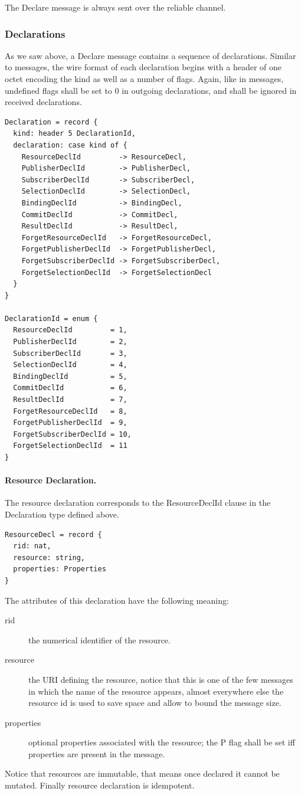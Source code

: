 \documentclass[a4paper,oneside,article]{memoir}
\begin{document}
The Declare message is always sent over the reliable channel.

\subsubsection{Declarations}

As we saw above, a Declare message contains a sequence of declarations.  Similar to messages, the
wire format of each declaration begins with a header of one octet encoding the kind as well as a
number of flags.  Again, like in messages, undefined flags shall be set to 0 in outgoing
declarations, and shall be ignored in received declarations.

\begin{verbatim}
Declaration = record {
  kind: header 5 DeclarationId,
  declaration: case kind of {
    ResourceDeclId         -> ResourceDecl,
    PublisherDeclId        -> PublisherDecl,
    SubscriberDeclId       -> SubscriberDecl,
    SelectionDeclId        -> SelectionDecl,
    BindingDeclId          -> BindingDecl,
    CommitDeclId           -> CommitDecl,
    ResultDeclId           -> ResultDecl,
    ForgetResourceDeclId   -> ForgetResourceDecl,
    ForgetPublisherDeclId  -> ForgetPublisherDecl,
    ForgetSubscriberDeclId -> ForgetSubscriberDecl,
    ForgetSelectionDeclId  -> ForgetSelectionDecl
  }
}

DeclarationId = enum {
  ResourceDeclId         = 1,
  PublisherDeclId        = 2,
  SubscriberDeclId       = 3,
  SelectionDeclId        = 4,
  BindingDeclId          = 5,
  CommitDeclId           = 6,
  ResultDeclId           = 7,
  ForgetResourceDeclId   = 8,
  ForgetPublisherDeclId  = 9,
  ForgetSubscriberDeclId = 10,
  ForgetSelectionDeclId  = 11
}
\end{verbatim}

\paragraph{Resource Declaration.} The resource declaration corresponds to the ResourceDeclId clause
in the Declaration type defined above.
\begin{verbatim}
ResourceDecl = record {
  rid: nat,
  resource: string,
  properties: Properties
}
\end{verbatim}
The attributes of this declaration have the following meaning:
\begin{description}
\item[rid] the numerical identifier of the resource.
\item[resource] the URI defining the resource, notice that this is one of the few messages in which
  the name of the resource appears, almost everywhere else the resource id is used to save space and
  allow to bound the message size.
\item[properties] optional properties associated with the resource; the P flag shall be set iff
  properties are present in the message.
\end{description}
Notice that resources are immutable, that means once declared it cannot be mutated. Finally resource
declaration is idempotent.
\end{document}
